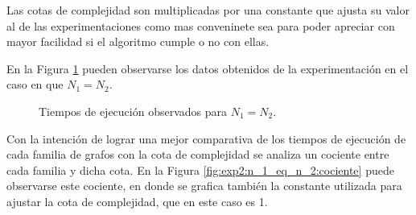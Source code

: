 Las cotas de complejidad son multiplicadas por una constante que ajusta su
valor al de las experimentaciones como mas conveninete sea para poder apreciar
con mayor facilidad si el algoritmo cumple o no con ellas.

\newcommand\constante{1}
En la Figura \ref{fig:exp2:n_1_eq_n_2} pueden observarse los datos obtenidos
de la experimentación en el caso en que $N_1 = N_2$.

\begin{figure}[H]
    \caption{Tiempos de ejecución observados para $N_1 = N_2$.}
    \label{fig:exp2:n_1_eq_n_2}
    \centering
\end{figure}

Con la intención de lograr una mejor comparativa de los tiempos de ejecución
de cada familia de grafos con la cota de complejidad se analiza un cociente
entre cada familia y dicha cota. En la Figura
\ref{fig:exp2:n_1_eq_n_2:cociente} puede observarse este cociente, en donde se
grafica también la constante utilizada para ajustar la cota de complejidad,
que en este caso es 1.

